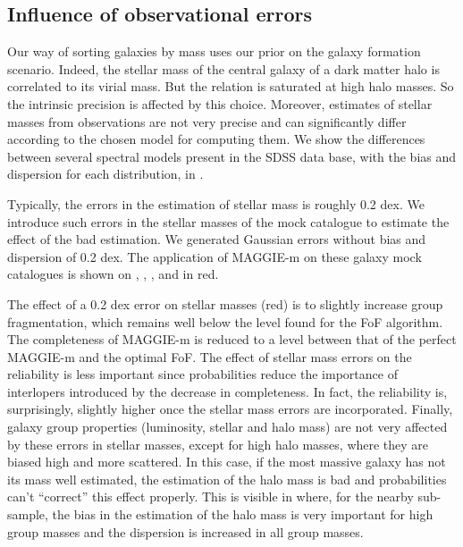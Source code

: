 \subsection{Influence of observational errors}
\label{sub:observational_errors}

Our way of sorting galaxies by mass uses our prior on the galaxy formation
scenario. Indeed, the stellar mass of the central galaxy of a dark matter halo
is correlated to its virial mass. But the relation is saturated at high halo
masses. So the intrinsic precision is affected by this choice. Moreover,
estimates of stellar masses from observations are not very precise and can
significantly differ according to the chosen model for computing them. We show
the differences between several spectral models present in the SDSS data base,
with the bias and dispersion for each distribution, in .

Typically, the errors in the estimation of stellar mass is roughly 0.2 dex. We
introduce such errors in the stellar masses of the mock catalogue to estimate
the effect of the bad estimation. We generated Gaussian errors without bias and
dispersion of 0.2 dex. The application of MAGGIE-m on these galaxy mock
catalogues is shown on , ,
,  and
 in red.

The effect of a 0.2 dex error on stellar masses (red) is to slightly increase
group fragmentation, which remains well below the level found for the FoF
algorithm. The completeness of MAGGIE-m is reduced to a level between that of
the perfect MAGGIE-m and the optimal FoF. The effect of stellar mass errors on
the reliability is less important since probabilities reduce the importance of
interlopers introduced by the decrease in completeness. In fact, the
reliability is, surprisingly, slightly higher once the stellar mass errors are
incorporated. Finally, galaxy group properties (luminosity, stellar and halo
mass) are not very affected by these errors in stellar masses, except for high
halo masses, where they are biased high and more scattered. In this case, if
the most massive galaxy has not its mass well estimated, the estimation of the
halo mass is bad and probabilities can't ``correct'' this effect properly. This
is visible in  where, for the nearby
sub-sample, the bias in the estimation of the halo mass is very important for
high group masses and the dispersion is increased in all group masses.

